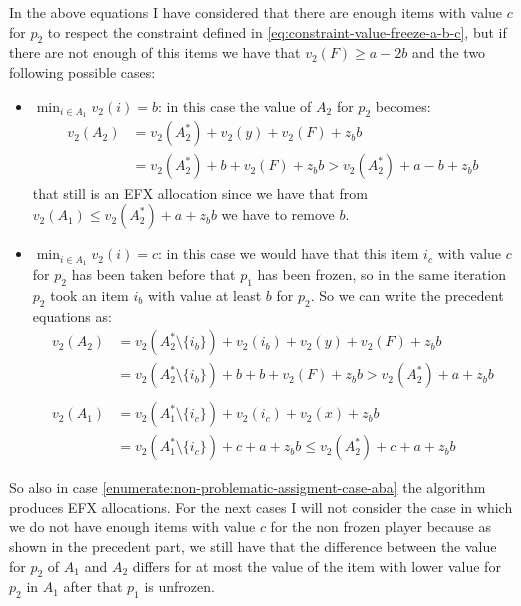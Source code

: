 In the above equations I have considered that there are enough items with value $c$ for $p_2$ to respect the constraint defined in \ref{eq:constraint-value-freeze-a-b-c}, but if there are not enough of this items we have that $v_2(F) \ge a-2b$ and the two following possible cases:
\begin{itemize}
        \item $\min_{i\in A_1} v_2(i) = b$: in this case the value of $A_2$ for $p_2$ becomes:
        \begin{align*}
            v_2(A_2) &= v_2(A_2^*) + v_2(y) + v_2(F) + z_b b \\
            &= v_2(A_2^*) + b + v_2(F) + z_bb > v_2(A_2^*) + a-b + z_b b
        \end{align*}
       that still is an EFX allocation since we have that from $v_2(A_1) \le v_2(A_2^*) + a + z_bb$ we have to remove $b$.
        \item $\min_{i\in A_1} v_2(i) = c$: in this case we would have that this item $i_c$ with value $c$ for $p_2$ has been taken before that $p_1$ has been frozen, so in the same iteration $p_2$ took an item $i_b$ with value at least $b$ for $p_2$. So we can write the precedent equations as:
        \begin{align*}
            v_2(A_2) &= v_2(A_2^*\setminus{\{i_b\}}) + v_2(i_b) + v_2(y) + v_2(F) + z_b b \\
            &= v_2(A_2^*\setminus{\{i_b\}}) + b + b + v_2(F) + z_bb  > v_2(A_2^*) + a + z_b b\\\\
            v_2(A_1) &= v_2(A_1^*\setminus{\{i_c\}}) + v_2(i_c)+ v_2(x) + z_bb  \\
            &=v_2(A_1^*\setminus{\{i_c\}}) + c  + a + z_bb \le v_2(A_2^*) + c + a + z_bb 
        \end{align*}
\end{itemize}
So also in case \ref{enumerate:non-problematic-assigment-case-aba} the algorithm produces EFX allocations. For the next cases I will not consider the case in which we do not have enough items with value $c$ for the non frozen player because as shown in the precedent part, we still have that the difference between the value for $p_2$ of $A_1$ and $A_2$ differs for at most the value of the item with lower value for $p_2$ in $A_1$ after that $p_1$ is unfrozen.


